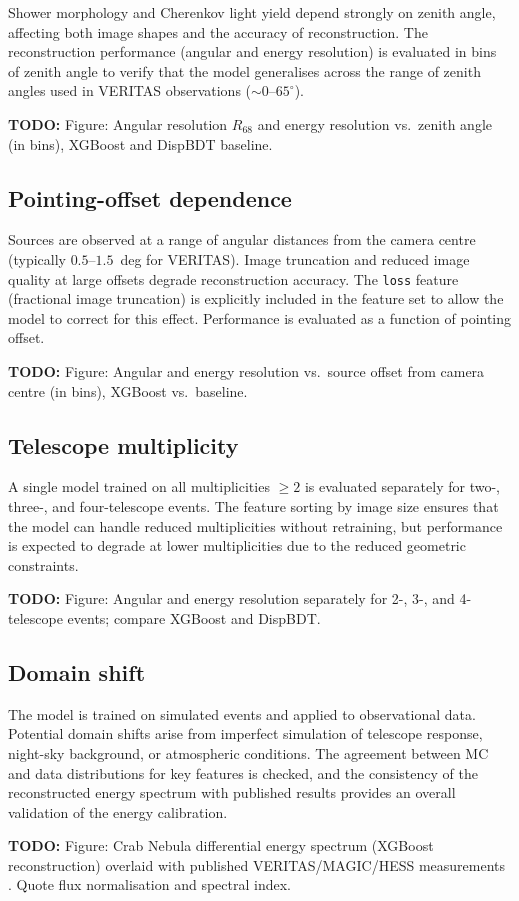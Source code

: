 \documentclass[12pt]{article}
\newcommand{\todo}[1]{\begin{hintBox} \textbf{TODO:} #1 \end{hintBox}}
\begin{document}
Shower morphology and Cherenkov light yield depend strongly on zenith angle,
affecting both image shapes and the accuracy of reconstruction.
The reconstruction performance (angular and energy resolution) is evaluated
in bins of zenith angle to verify that the model generalises across the
range of zenith angles used in VERITAS observations ($\sim 0$--$65^\circ$).
\todo{Figure: Angular resolution $R_{68}$ and energy resolution vs.\ zenith angle (in bins), XGBoost and DispBDT baseline.}

\subsection{Pointing-offset dependence}

Sources are observed at a range of angular distances from the camera centre
(typically $0.5$--$1.5$~deg for VERITAS).
Image truncation and reduced image quality at large offsets degrade reconstruction
accuracy. The \texttt{loss} feature (fractional image truncation) is explicitly
included in the feature set to allow the model to correct for this effect.
Performance is evaluated as a function of pointing offset.
\todo{Figure: Angular and energy resolution vs.\ source offset from camera centre (in bins), XGBoost vs.\ baseline.}

\subsection{Telescope multiplicity}

A single model trained on all multiplicities $\geq 2$ is evaluated separately
for two-, three-, and four-telescope events.
The feature sorting by image size ensures that the model can handle reduced
multiplicities without retraining, but performance is expected to degrade
at lower multiplicities due to the reduced geometric constraints.
\todo{Figure: Angular and energy resolution separately for 2-, 3-, and 4-telescope events; compare XGBoost and DispBDT.}

\subsection{Domain shift}

The model is trained on simulated events and applied to observational data.
Potential domain shifts arise from imperfect simulation of telescope response,
night-sky background, or atmospheric conditions.
The agreement between MC and data distributions for key features is checked,
and the consistency of the reconstructed energy spectrum with published results
provides an overall validation of the energy calibration.
\todo{Figure: Crab Nebula differential energy spectrum (XGBoost reconstruction) overlaid with published VERITAS/MAGIC/HESS measurements \citep{2015ICRC...34..792A}. Quote flux normalisation and spectral index.}
\end{document}
